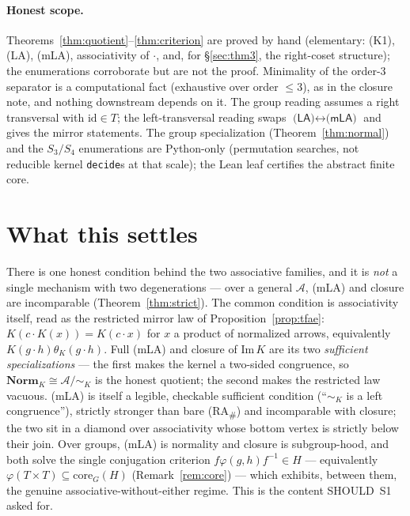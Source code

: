 \documentclass[11pt]{amsart}
\theoremstyle{plain}
\theoremstyle{definition}
\theoremstyle{remark}
\newcommand{\Norm}{\mathbf{Norm}}
\newcommand{\Img}{\mathrm{Im}\,}
\newcommand{\id}{\mathrm{id}}
\newcommand{\LA}{\textsf{(LA)}}
\newcommand{\mLA}{\textsf{(mLA)}}
\newcommand{\RA}{\textsf{(RA}\textsubscript{\#}\textsf{)}}
\newcommand{\simK}{\mathrel{\sim_{K}}}
\begin{document}
\paragraph{Honest scope.} Theorems~\ref{thm:quotient}--\ref{thm:criterion} are proved by hand
(elementary: \textsf{(K1)}, \LA{}, \mLA{}, associativity of $\cdot$, and, for §\ref{sec:thm3}, the
right-coset structure); the enumerations corroborate but are not the proof. Minimality of the order-$3$
separator is a computational fact (exhaustive over order $\le3$), as in the closure note, and nothing
downstream depends on it. The group reading assumes a right transversal with $\id\in T$; the
left-transversal reading swaps $\LA{}\leftrightarrow\mLA{}$ and gives the mirror statements. The group
specialization (Theorem~\ref{thm:normal}) and the $S_3/S_4$ enumerations are Python-only (permutation
searches, not reducible kernel \texttt{decide}s at that scale); the Lean leaf certifies the abstract
finite core.

\section*{What this settles}

There is one honest condition behind the two associative families, and it is \emph{not} a single
mechanism with two degenerations --- over a general $\mathcal{A}$, \mLA{} and closure are incomparable
(Theorem~\ref{thm:strict}). The common condition is associativity itself, read as the restricted
mirror law of Proposition~\ref{prop:tfae}: $K(c\cdot K(x))=K(c\cdot x)$ for $x$ a product of
normalized arrows, equivalently $K(g\cdot h)\mathbin{\theta_K}(g\cdot h)$. Full \mLA{} and closure of
$\Img K$ are its two \emph{sufficient specializations} --- the first makes the kernel a two-sided
congruence, so $\Norm_K\cong\mathcal{A}/\!\simK$ is the honest quotient; the second makes the
restricted law vacuous. \mLA{} is itself a legible, checkable sufficient condition (``$\simK$ is a
left congruence''), strictly stronger than bare \RA{} and incomparable with closure; the two sit in a
diamond over associativity whose bottom vertex is strictly below their join. Over groups, \mLA{} is
normality and closure is subgroup-hood, and both solve the single conjugation criterion
$f\varphi(g,h)f^{-1}\in H$ --- equivalently $\varphi(T\times T)\subseteq\mathrm{core}_G(H)$
(Remark~\ref{rem:core}) --- which exhibits, between them, the genuine associative-without-either
regime. This is the content SHOULD~S1 asked for.
\end{document}

